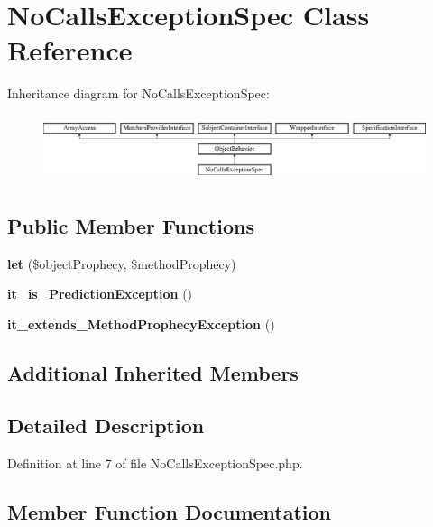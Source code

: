 \section{No\+Calls\+Exception\+Spec Class Reference}
\label{classspec_1_1_prophecy_1_1_exception_1_1_prediction_1_1_no_calls_exception_spec}
Inheritance diagram for No\+Calls\+Exception\+Spec\+:\begin{figure}[H]
\begin{center}
\leavevmode
\includegraphics[height=1.953488cm]{classspec_1_1_prophecy_1_1_exception_1_1_prediction_1_1_no_calls_exception_spec}
\end{center}
\end{figure}
\subsection*{Public Member Functions}
\begin{DoxyCompactItemize}
\item 
{\bf let} (\$object\+Prophecy, \$method\+Prophecy)
\item 
{\bf it\+\_\+is\+\_\+\+Prediction\+Exception} ()
\item 
{\bf it\+\_\+extends\+\_\+\+Method\+Prophecy\+Exception} ()
\end{DoxyCompactItemize}
\subsection*{Additional Inherited Members}


\subsection{Detailed Description}


Definition at line 7 of file No\+Calls\+Exception\+Spec.\+php.



\subsection{Member Function Documentation}
